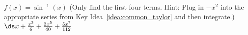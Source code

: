 {$f(x) = \sin^{-1}(x)$ (Only find the first four terms. Hint: Plug in $-x^2$ into the appropriate series from Key Idea~\ref{idea:common_taylor} and then integrate.)
}
{$\ds x+\frac{x^3}{6}+\frac{3x^5}{40}+\frac{5x^7}{112}$
}